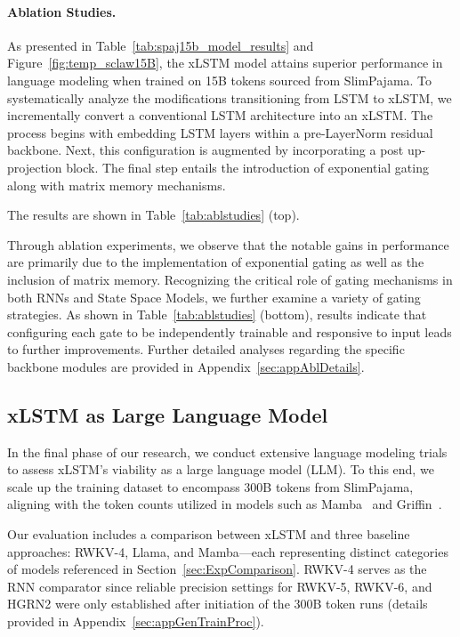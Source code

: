 \paragraph{Ablation Studies.}
As presented in Table~\ref{tab:spaj15b_model_results} and Figure~\ref{fig:temp_sclaw15B}, the xLSTM model attains superior performance in language modeling when trained on 15B tokens sourced from SlimPajama. To systematically analyze the modifications transitioning from LSTM to xLSTM, we incrementally convert a conventional LSTM architecture into an xLSTM. The process begins with embedding LSTM layers within a pre-LayerNorm residual backbone. Next, this configuration is augmented by incorporating a post up-projection block. The final step entails the introduction of exponential gating along with matrix memory mechanisms.

The results are shown in Table~\ref{tab:ablstudies} (top). 

Through ablation experiments, we observe that the notable gains in performance are primarily due to the implementation of exponential gating as well as the inclusion of matrix memory. Recognizing the critical role of gating mechanisms in both RNNs and State Space Models, we further examine a variety of gating strategies. As shown in Table~\ref{tab:ablstudies} (bottom), results indicate that configuring each gate to be independently trainable and responsive to input leads to further improvements. Further detailed analyses regarding the specific backbone modules are provided in Appendix~\ref{sec:appAblDetails}.

\subsection{xLSTM as Large Language Model}
\label{sec:ExpLanguage}

In the final phase of our research, we conduct extensive language modeling trials to assess xLSTM’s viability as a large language model (LLM). To this end, we scale up the training dataset to encompass 300B tokens from SlimPajama, aligning with the token counts utilized in models such as Mamba~\citep{Gu:24arxiv} and Griffin~\citep{De:24arxiv}. 

Our evaluation includes a comparison between xLSTM and three baseline approaches: RWKV-4, Llama, and Mamba—each representing distinct categories of models referenced in Section~\ref{sec:ExpComparison}. RWKV-4 serves as the RNN comparator since reliable precision settings for RWKV-5, RWKV-6, and HGRN2 were only established after initiation of the 300B token runs (details provided in Appendix~\ref{sec:appGenTrainProc}). 

